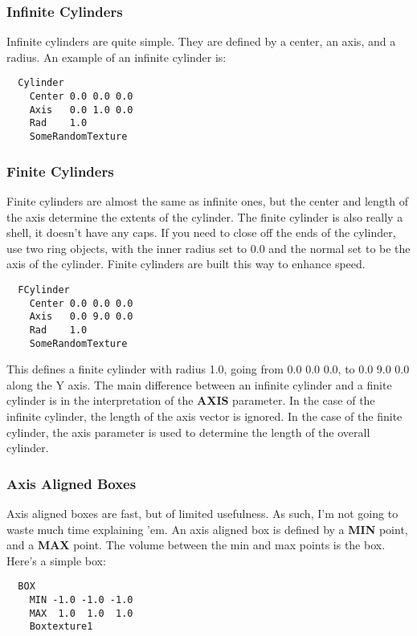 \subsubsection{Infinite Cylinders}
  Infinite cylinders are quite simple.  They are defined by a center, an 
axis, and a radius.  An example of an infinite cylinder is:
\begin{verbatim}
  Cylinder
    Center 0.0 0.0 0.0
    Axis   0.0 1.0 0.0
    Rad    1.0
    SomeRandomTexture
\end{verbatim}

\subsubsection{Finite Cylinders}
  Finite cylinders are almost the same as infinite ones, but the
  center and length of the axis determine the extents of the cylinder.  
  The finite cylinder is also really a shell, it doesn't have any
  caps.  If you need to close off the ends of the cylinder, use two
  ring objects, with the inner radius set to 0.0 and the normal set
  to be the axis of the cylinder.  Finite cylinders are built this
  way to enhance speed. 

\begin{verbatim}
  FCylinder
    Center 0.0 0.0 0.0
    Axis   0.0 9.0 0.0
    Rad    1.0
    SomeRandomTexture
\end{verbatim}
This defines a finite cylinder with radius 1.0, going from 0.0 0.0 0.0, to 
0.0 9.0 0.0 along the Y axis.  The main difference between an infinite cylinder
and a finite cylinder is in the interpretation of the {\bf AXIS} parameter.
In the case of the infinite cylinder, the length of the axis vector is 
ignored.  In the case of the finite cylinder, the axis parameter is used
to determine the length of the overall cylinder.

\subsubsection{Axis Aligned Boxes}
  Axis aligned boxes are fast, but of limited usefulness.  As such, I'm
not going to waste much time explaining 'em.  An axis aligned box is
defined by a {\bf MIN} point, and a {\bf MAX} point.  The volume between
the min and max points is the box.  Here's a simple box:
\begin{verbatim}
  BOX
    MIN -1.0 -1.0 -1.0
    MAX  1.0  1.0  1.0
    Boxtexture1   
\end{verbatim}

